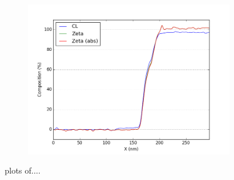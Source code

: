 \begin{figure}
\begin{subfigure}{.45\textwidth}
			\includegraphics[width=\linewidth]{fig/q/1_ge_nm}
			\caption{}
			\label{fig:zeta_area1_ge}
	\end{subfigure}
\hfill
	\caption{plots of....}
	\label{fig:zeta_area1}
\end{figure}

